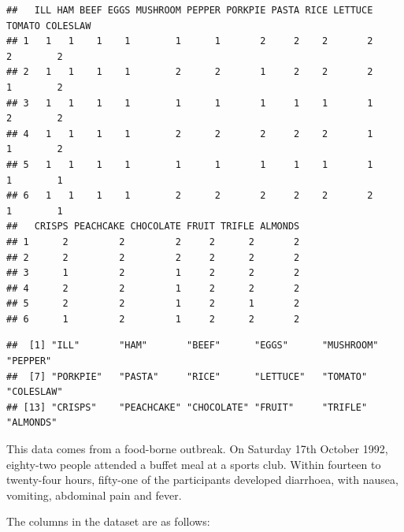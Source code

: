 \documentclass[
  12pt,
]{book}
\begin{document}
\begin{verbatim}
##   ILL HAM BEEF EGGS MUSHROOM PEPPER PORKPIE PASTA RICE LETTUCE TOMATO COLESLAW
## 1   1   1    1    1        1      1       2     2    2       2      2        2
## 2   1   1    1    1        2      2       1     2    2       2      1        2
## 3   1   1    1    1        1      1       1     1    1       1      2        2
## 4   1   1    1    1        2      2       2     2    2       1      1        2
## 5   1   1    1    1        1      1       1     1    1       1      1        1
## 6   1   1    1    1        2      2       2     2    2       2      1        1
##   CRISPS PEACHCAKE CHOCOLATE FRUIT TRIFLE ALMONDS
## 1      2         2         2     2      2       2
## 2      2         2         2     2      2       2
## 3      1         2         1     2      2       2
## 4      2         2         1     2      2       2
## 5      2         2         1     2      1       2
## 6      1         2         1     2      2       2
\end{verbatim}

\begin{verbatim}
##  [1] "ILL"       "HAM"       "BEEF"      "EGGS"      "MUSHROOM"  "PEPPER"   
##  [7] "PORKPIE"   "PASTA"     "RICE"      "LETTUCE"   "TOMATO"    "COLESLAW" 
## [13] "CRISPS"    "PEACHCAKE" "CHOCOLATE" "FRUIT"     "TRIFLE"    "ALMONDS"
\end{verbatim}

This data comes from a food-borne outbreak. On Saturday 17th October 1992, eighty-two people attended a buffet meal at a sports club. Within fourteen to twenty-four hours, fifty-one of the participants developed diarrhoea, with nausea, vomiting, abdominal pain and fever.

The columns in the dataset are as follows:
\end{document}

